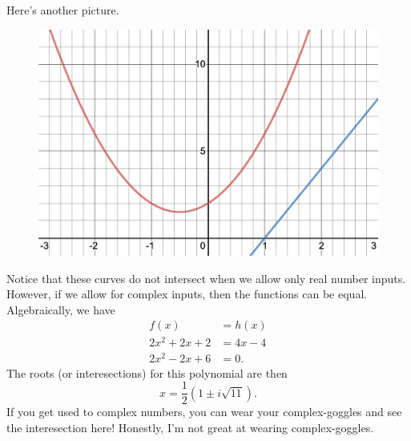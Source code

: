 \documentclass[12pt]{article} %
\begin{document}
\begin{solution}
Here's another picture.
\begin{figure}[H]
    \centering
    \includegraphics[width=.8\textwidth]{Homework_0/desmos-graph(2).png}
\end{figure}
Notice that these curves do not intersect when we allow only real number inputs. However, if we allow for complex inputs, then the functions can be equal. Algebraically, we have
\begin{align*}
    f(x)&=h(x)\\
    2x^2+2x+2&= 4x-4\\
    2x^2-2x+6&=0.
\end{align*}
The roots (or interesections) for this polynomial are then
\[
x=\frac{1}{2}\left( 1 \pm i \sqrt{11}\right).
\]
If you get used to complex numbers, you can wear your complex-goggles and see the interesection here! Honestly, I'm not great at wearing complex-goggles.
\end{solution}
\end{document}
